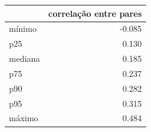 \begin{tabular}{lr}
\toprule
 & correlação entre pares \\
\midrule
mínimo & -0.085 \\
p25 & 0.130 \\
mediana & 0.185 \\
p75 & 0.237 \\
p90 & 0.282 \\
p95 & 0.315 \\
máximo & 0.484 \\
\bottomrule
\end{tabular}
